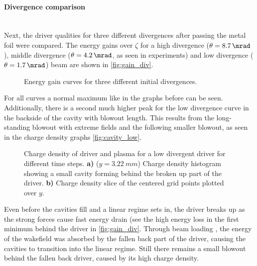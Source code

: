 \documentclass[bachelor_thesis]{subfiles}
\begin{document}
\paragraph*{Divergence comparison}\label{para:div_comp}\hspace{0pt} \\
Next, the driver qualities for three different divergences after passing the metal foil were compared. The energy gains over $\zeta$ for a high divergence ($\theta=\qty{8.7}{\mrad}$), middle divergence ($\theta=\qty{4.2}{\mrad}$, as seen in experiments) 
and low divergence ($\theta=\qty{1.7}{\mrad}$) beam are shown in \autoref{fig:gain_div}.
\begin{figure}
	\centering
	
	\caption{Energy gain curves for three different initial divergences.}
	\label{fig:gain_div}
\end{figure}
For all curves a normal maximum like in the graphs before can be seen. Additionally, there is a second much higher peak for the low divergence curve in the backside of the cavity with blowout length.
This results from the long-standing blowout with extreme fields and the following smaller blowout, as seen in the charge density graphs \autoref{fig:cavity_low}.

\begin{figure}
	\centering
	
	\caption{Charge density of driver and plasma for a low divergent driver for different time steps.
	\textbf{a)} ($y=\qty{3.22}{mm}$) Charge density histogram showing a small cavity forming behind the broken up part of the driver.
	\textbf{b)} Charge density slice of the centered grid points plotted over $y$. 
	}
	\label{fig:cavity_low}
\end{figure}
Even before the cavities fill and a linear regime sets in, the driver breaks up as the strong forces cause fast energy drain (see the high energy loss in the first minimum behind the driver in \autoref{fig:gain_div}.
Through beam loading \cite{Kirchen2021, Goetzfried2020}, the energy of the wakefield was absorbed by the fallen back part of the driver, causing the cavities to transition into the linear regime. 
Still there remains a small blowout behind the  fallen back driver, caused by its high charge density.
\end{document}
